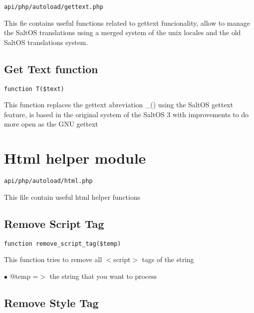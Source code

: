 \documentclass[a4paper]{book}
\begin{document}
\begin{lstlisting}
api/php/autoload/gettext.php
\end{lstlisting}

This fie contains useful functions related to gettext funcionality, allow to manage the
SaltOS translations using a merged system of the unix locales and the old SaltOS translations
system.

\hypertarget{toc146}{}
\subsection{Get Text function}

\begin{lstlisting}
function T($text)
\end{lstlisting}

This function replaces the gettext abreviation \_() using the SaltOS gettext
feature, is based in the original system of the SaltOS 3 with improvements
to do more open as the GNU gettext

\hypertarget{toc147}{}
\section{Html helper module}

\begin{lstlisting}
api/php/autoload/html.php
\end{lstlisting}

This file contain useful html helper functions

\hypertarget{toc148}{}
\subsection{Remove Script Tag}

\begin{lstlisting}
function remove_script_tag($temp)
\end{lstlisting}

This function tries to remove all $<$script$>$ tags of the string

\begin{compactitem}
\item[\color{myblue}$\bullet$] @temp =$>$ the string that you want to process
\end{compactitem}

\hypertarget{toc149}{}
\subsection{Remove Style Tag}
\end{document}
